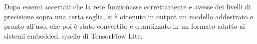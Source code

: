 Dopo esserci accertati che la rete funzionasse correttamente e avesse dei livelli di precisione sopra una certa soglia, si è ottenuto in output un modello addestrato e pronto all’uso, che poi è stato convertito e quantizzato in un formato adatto ai sistemi embedded, quello di TensorFlow Lite.
